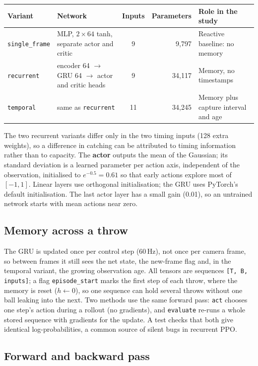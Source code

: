 \documentclass[10pt,a4paper]{article}
\newcommand{\code}[1]{\texttt{#1}}
\begin{document}
\begin{tabularx}{\textwidth}{@{}llcrX@{}}
  \toprule
  Variant & Network & Inputs & Parameters & Role in the study \\
  \midrule
  \code{single\_frame} & MLP, $2\times64$ tanh, separate actor and critic & 9  &  9{,}797 & Reactive baseline: no memory \\
  \code{recurrent}     & encoder 64 $\to$ GRU 64 $\to$ actor and critic heads & 9  & 34{,}117 & Memory, no timestamps \\
  \code{temporal}      & same as \code{recurrent}                     & 11 & 34{,}245 & Memory plus capture interval and age \\
  \bottomrule
\end{tabularx}

The two recurrent variants differ only in the two timing inputs (128 extra weights), so a difference
in catching can be attributed to timing information rather than to capacity. The \textbf{actor}
outputs the mean of the Gaussian; its standard deviation is a learned parameter per action axis,
independent of the observation, initialised to $e^{-0.5} = 0.61$ so that early actions explore most
of $[-1,1]$. Linear layers use orthogonal initialisation; the GRU uses PyTorch's default
initialisation. The last actor layer has a small gain (0.01), so an untrained network starts with
mean actions near zero.

\subsection{Memory across a throw}

The GRU is updated once per control step (60\,Hz), not once per camera frame, so between frames it
still sees the net state, the new-frame flag and, in the temporal variant, the growing observation
age. All tensors are sequences \code{[T, B, inputs]}; a flag \code{episode\_start} marks the first
step of each throw, where the memory is reset ($h \leftarrow 0$), so one sequence can hold several
throws without one ball leaking into the next. Two methods use the same forward pass:
\code{act} chooses one step's action during a rollout (no gradients), and \code{evaluate} re-runs a
whole stored sequence with gradients for the update. A test checks that both give identical
log-probabilities, a common source of silent bugs in recurrent PPO.

\subsection{Forward and backward pass}
\end{document}
